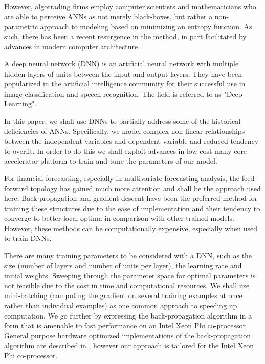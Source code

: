 \documentclass{article}
\begin{document}
However, algotrading firms employ computer scientists and mathematicians who are able to perceive ANNs as not merely black-boxes, but rather a non-parametric approach to modeling based on minimizing an entropy function. As such, there has been a recent resurgence in the method, in part facilitated by advances in modern computer architecture \citep{Chen2013, Niaki2013, Vanstone2010}.


A deep neural network (DNN) is an artificial neural network with multiple hidden layers of units between the input and output layers. They have been popularized in the artificial intelligence community for their successful use in image classification \citep{krizhevsky2012} and speech recognition. The field is referred to as "Deep Learning".
  
In this paper, we shall use DNNs to partially address some of the historical deficiencies of ANNs. Specifically, we model complex non-linear relationships between the independent variables and dependent variable and reduced tendency to overfit. In order to do this we shall exploit advances in low cost many-core accelerator platform to train and tune the parameters of our model.

For financial forecasting, especially in multivariate forecasting analysis, the feed-forward
topology has gained much more attention and shall be the approach used here. Back-propagation and gradient descent have been the preferred method for training these structures due to the ease of implementation and their tendency to converge to better local optima in comparison with other trained models. However, these methods can be computationally expensive, especially when used to train DNNs. 

There are many training parameters to be considered with a DNN, such as the size (number of layers and number of units per layer), the learning rate and initial weights. Sweeping through the parameter space for optimal parameters is not feasible due to the cost in time and computational resources. We shall use mini-batching (computing the gradient on several training examples at once rather than individual examples) as one common approach to speeding up computation. We go further by expressing the back-propagation algorithm in a form that is amenable to fast performance on an Intel Xeon Phi co-processor \citep{Jeffers2013}. General purpose hardware optimized implementations of the back-propagation algorithm are described in \citep{Shekhar94}, however our approach is tailored for the Intel Xeon Phi co-processor.
\end{document}
